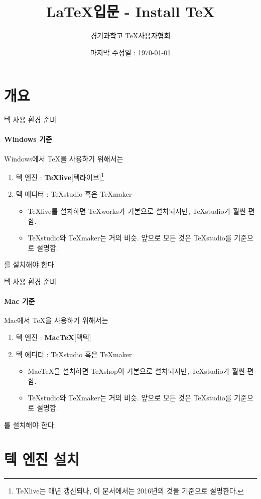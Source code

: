 \documentclass[12pt]{beamer}
\title[\LaTeX \ - 설치하기]{\LaTeX 입문 - Install \TeX}
\author{경기과학고 \TeX 사용자협회}
\institute[GSHSTeXSociety]{\url{latex.gs.hs.kr}}
\date{마지막 수정일 : \today}
\begin{document}
\begin{frame}
\titlepage %
\end{frame}


\section{개요}
\begin{frame}{텍 사용 환경 준비}
	\framesubtitle{Windows 기준}
	Windows에서 \TeX 을 사용하기 위해서는
	\begin{enumerate}
		\item 텍 엔진 : \textbf{TeXlive}[텍라이브]\footnote{TeXlive는 매년 갱신되나, 이 문서에서는 2016년의 것을 기준으로 설명한다.}
		\item 텍 에디터 : TeXstudio 혹은 TeXmaker
		\begin{itemize}
			\item TeXlive를 설치하면 TeXworks가 기본으로 설치되지만,
			TeXstudio가 훨씬 편함.
			\item TeXstudio와 TeXmaker는 거의 비슷. 앞으로 모든 것은 TeXstudio를 기준으로 설명함.
		\end{itemize}
	\end{enumerate}
	를 설치해야 한다.
\end{frame}
\begin{frame}{텍 사용 환경 준비}
	\framesubtitle{Mac 기준}
	Mac에서 \TeX 을 사용하기 위해서는
	\begin{enumerate}
		\item 텍 엔진 : \textbf{MacTeX}[맥텍]
		\item 텍 에디터 : TeXstudio 혹은 TeXmaker
		\begin{itemize}
			\item MacTeX을 설치하면 TeXshop이 기본으로 설치되지만,
			TeXstudio가 훨씬 편함.
			\item TeXstudio와 TeXmaker는 거의 비슷. 앞으로 모든 것은 TeXstudio를 기준으로 설명함.
		\end{itemize}
	\end{enumerate}
	를 설치해야 한다.
\end{frame}


\section{텍 엔진 설치}
\end{document}
